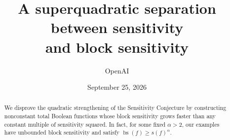 \documentclass[11pt]{article}
\title{A superquadratic separation between sensitivity\\and block sensitivity}
\author{OpenAI}
\date{September 25, 2026}
\newcommand{\bs}{\operatorname{bs}}
\theoremstyle{definition}
\theoremstyle{remark}
\begin{document}
\maketitle
\begin{abstract}
We disprove the quadratic strengthening of the Sensitivity Conjecture by
constructing nonconstant total Boolean functions whose block sensitivity grows
faster than any constant multiple of sensitivity squared. In fact, for some
fixed \(\alpha>2\), our examples have unbounded block sensitivity and satisfy
\(\bs(f)\ge s(f)^\alpha\).
\end{abstract}






\end{document}
